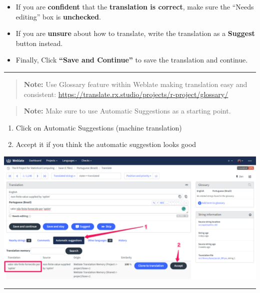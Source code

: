 \documentclass[
]{book}
\begin{document}
\begin{itemize}
\item
  If you are \textbf{confident} that the \textbf{translation is correct}, make
  sure the ``Needs editing'' box is \textbf{unchecked}.
\item
  If you are \textbf{unsure} about how to translate, write the translation
  as a \textbf{Suggest} button instead.
\item
  Finally, Click \textbf{``Save and Continue''} to save the translation and
  continue.
\end{itemize}

\begin{center}\rule{0.5\linewidth}{0.5pt}\end{center}

\begin{quote}
\textbf{Note:} Use Glossary feature within Weblate making translation easy
and consistent:
\url{https://translate.rx.studio/projects/r-project/glossary/}
\end{quote}

\begin{quote}
\textbf{Note:} Make sure to use Automatic Suggestions as a starting point.
\end{quote}

\begin{enumerate}
\def\labelenumi{\arabic{enumi}.}
\item
  Click on Automatic Suggestions (machine translation)
\item
  Accept it if you think the automatic suggestion looks good
\end{enumerate}

\includegraphics{img/auto-suggestion.png}

\begin{center}\rule{0.5\linewidth}{0.5pt}\end{center}
\end{document}
